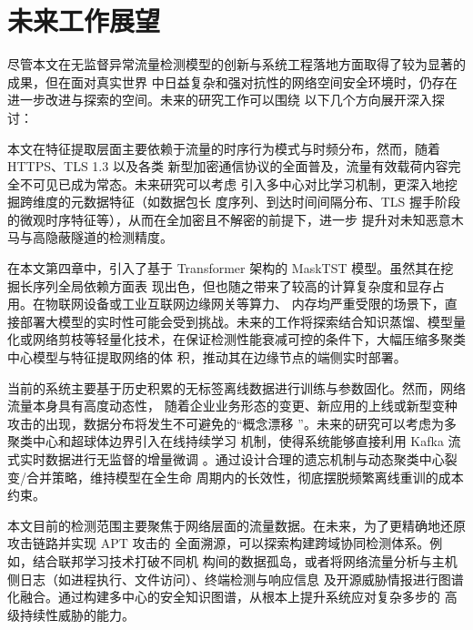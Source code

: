 \section{未来工作展望}
尽管本文在无监督异常流量检测模型的创新与系统工程落地方面取得了较为显著的成果，但在面对真实世界
中日益复杂和强对抗性的网络空间安全环境时，仍存在进一步改进与探索的空间。未来的研究工作可以围绕
以下几个方向展开深入探讨：

本文在特征提取层面主要依赖于流量的时序行为模式与时频分布，然而，随着 HTTPS、TLS 1.3 以及各类
新型加密通信协议的全面普及，流量有效载荷内容完全不可见已成为常态。未来研究可以考虑
引入多中心对比学习机制，更深入地挖掘跨维度的元数据特征（如数据包长
度序列、到达时间间隔分布、TLS 握手阶段的微观时序特征等），从而在全加密且不解密的前提下，进一步
提升对未知恶意木马与高隐蔽隧道的检测精度。

在本文第四章中，引入了基于 Transformer 架构的 MaskTST 模型。虽然其在挖掘长序列全局依赖方面表
现出色，但也随之带来了较高的计算复杂度和显存占用。在物联网设备或工业互联网边缘网关等算力、
内存均严重受限的场景下，直接部署大模型的实时性可能会受到挑战。未来的工作将探索结合知识蒸馏、模型量
化或网络剪枝等轻量化技术，在保证检测性能衰减可控的条件下，大幅压缩多聚类中心模型与特征提取网络的体
积，推动其在边缘节点的端侧实时部署。

当前的系统主要基于历史积累的无标签离线数据进行训练与参数固化。然而，网络流量本身具有高度动态性，
随着企业业务形态的变更、新应用的上线或新型变种攻击的出现，数据分布将发生不可避免的“概念漂移
”。未来的研究可以考虑为多聚类中心和超球体边界引入在线持续学习
机制，使得系统能够直接利用 Kafka 流式实时数据进行无监督的增量微调
。通过设计合理的遗忘机制与动态聚类中心裂变/合并策略，维持模型在全生命
周期内的长效性，彻底摆脱频繁离线重训的成本约束。

本文目前的检测范围主要聚焦于网络层面的流量数据。在未来，为了更精确地还原攻击链路并实现 APT 攻击的
全面溯源，可以探索构建跨域协同检测体系。例如，结合联邦学习技术打破不同机
构间的数据孤岛，或者将网络流量分析与主机侧日志（如进程执行、文件访问）、终端检测与响应信息
及开源威胁情报进行图谱化融合。通过构建多中心的安全知识图谱，从根本上提升系统应对复杂多步的
高级持续性威胁的能力。